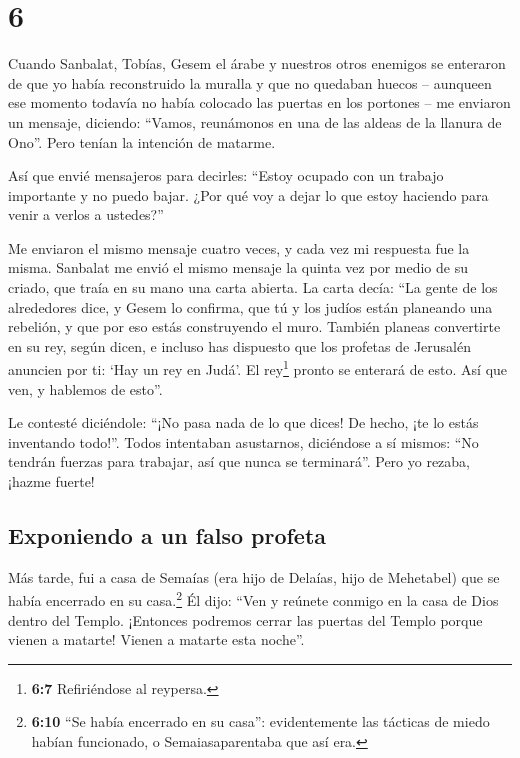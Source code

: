 \hypertarget{section-5}{%
\section{6}\label{section-5}}

 Cuando Sanbalat, Tobías, Gesem el árabe y nuestros otros
enemigos se enteraron de que yo había reconstruido la muralla y que no
quedaban huecos -- aunqueen ese momento todavía no había colocado las
puertas en los portones --  me enviaron un mensaje,
diciendo: ``Vamos, reunámonos en una de las aldeas de la llanura de
Ono''. Pero tenían la intención de matarme.

 Así que envié mensajeros para decirles: ``Estoy ocupado
con un trabajo importante y no puedo bajar. ¿Por qué voy a dejar lo que
estoy haciendo para venir a verlos a ustedes?''

 Me enviaron el mismo mensaje cuatro veces, y cada vez mi
respuesta fue la misma.  Sanbalat me envió el mismo
mensaje la quinta vez por medio de su criado, que traía en su mano una
carta abierta.  La carta decía: ``La gente de los
alrededores dice, y Gesem lo confirma, que tú y los judíos están
planeando una rebelión, y que por eso estás construyendo el muro.
También planeas convertirte en su rey, según dicen,  e
incluso has dispuesto que los profetas de Jerusalén anuncien por ti:
`Hay un rey en Judá'. El rey\footnote{\textbf{6:7} Refiriéndose al
  reypersa.} pronto se enterará de esto. Así que ven, y hablemos de
esto''.

 Le contesté diciéndole: ``¡No pasa nada de lo que dices!
De hecho, ¡te lo estás inventando todo!''.  Todos
intentaban asustarnos, diciéndose a sí mismos: ``No tendrán fuerzas para
trabajar, así que nunca se terminará''. Pero yo rezaba, ¡hazme fuerte!

\hypertarget{exponiendo-a-un-falso-profeta}{%
\subsection{Exponiendo a un falso
profeta}\label{exponiendo-a-un-falso-profeta}}

 Más tarde, fui a casa de Semaías (era hijo de Delaías,
hijo de Mehetabel) que se había encerrado en su casa.\footnote{\textbf{6:10}
  ``Se había encerrado en su casa'': evidentemente las tácticas de miedo
  habían funcionado, o Semaiasaparentaba que así era.} Él dijo: ``Ven y
reúnete conmigo en la casa de Dios dentro del Templo. ¡Entonces podremos
cerrar las puertas del Templo porque vienen a matarte! Vienen a matarte
esta noche''.

